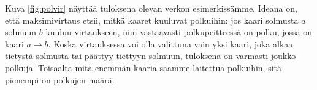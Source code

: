 Kuva \ref{fig:polvir} näyttää tuloksena olevan verkon
esimerkissämme.
Ideana on, että maksimivirtaus etsii,
mitkä kaaret kuuluvat polkuihin:
jos kaari solmusta $a$ solmuun $b$ kuuluu virtaukseen,
niin vastaavasti polkupeitteessä on polku,
jossa on kaari $a \rightarrow b$.
Koska virtauksessa voi olla valittuna vain yksi kaari,
joka alkaa tietystä solmusta tai päättyy tiettyyn solmuun,
tuloksena on varmasti joukko polkuja.
Toisaalta mitä enemmän kaaria saamme laitettua polkuihin,
sitä pienempi on polkujen määrä.